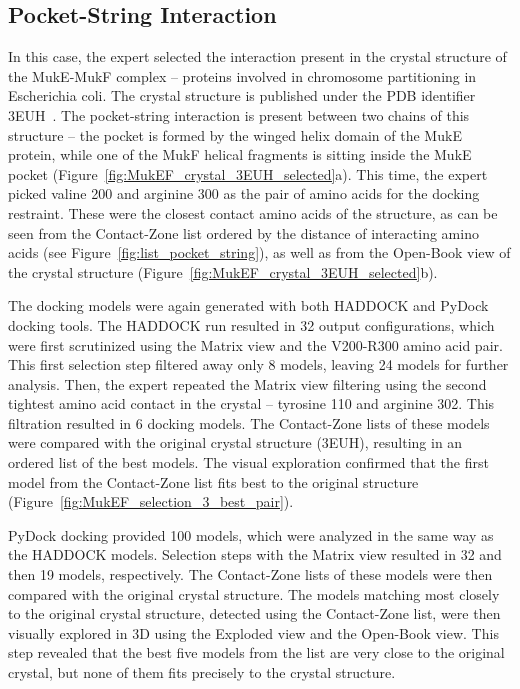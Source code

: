 \documentclass{bmcart}
\def\OpBook {Open-Book view\xspace}
\def\ExpView {Exploded view\xspace}
\def\MatView {Matrix view\xspace}
\def\CoZoList{Contact-Zone list\xspace}
\def\CoZoLists{Contact-Zone lists\xspace}
\begin{document}
\subsection{Pocket-String Interaction}
In this case, the expert selected the interaction present in the crystal structure of the MukE-MukF complex -- proteins involved in chromosome partitioning in Escherichia coli. 
The crystal structure is published under the PDB identifier 3EUH~\cite{Woo}. 
The pocket-string interaction is present between two chains of this structure -- the pocket is formed by the winged helix domain of the MukE protein, while one of the MukF helical fragments is sitting inside the MukE pocket (Figure~\ref{fig:MukEF_crystal_3EUH_selected}a). 
This time, the expert picked valine 200 and arginine 300 as the pair of amino acids for the docking restraint. 
These were the closest contact amino acids of the structure, as can be seen from the \CoZoList ordered by the distance of interacting amino acids (see Figure~\ref{fig:list_pocket_string}), as well as from the \OpBook of the crystal structure (Figure~\ref{fig:MukEF_crystal_3EUH_selected}b). 

The docking models were again generated with both HADDOCK and PyDock docking tools.
The HADDOCK run resulted in 32 output configurations, which were first scrutinized using the \MatView and the V200-R300 amino acid pair. 
This first selection step filtered away only 8 models, leaving 24 models for further analysis. 
Then, the expert repeated the \MatView filtering using the second tightest amino acid contact in the crystal -- tyrosine 110 and arginine 302. 
This filtration resulted in 6 docking models. 
The \CoZoLists of these models were compared with the original crystal structure (3EUH), resulting in an ordered list of the best models.
The visual exploration confirmed that the first model from the \CoZoList fits best to the original structure (Figure~\ref{fig:MukEF_selection_3_best_pair}). 

PyDock docking provided 100 models, which were analyzed in the same way as the HADDOCK models. 
Selection steps with the \MatView resulted in 32 and then 19 models, respectively. 
The \CoZoLists of these models were then compared with the original crystal structure.
The models matching most closely to the original crystal structure, detected using the \CoZoList, were then visually explored in 3D using the \ExpView and the \OpBook.
This step revealed that the best five models from the list are very close to the original crystal, but none of them fits precisely to the crystal structure.
\end{document}
